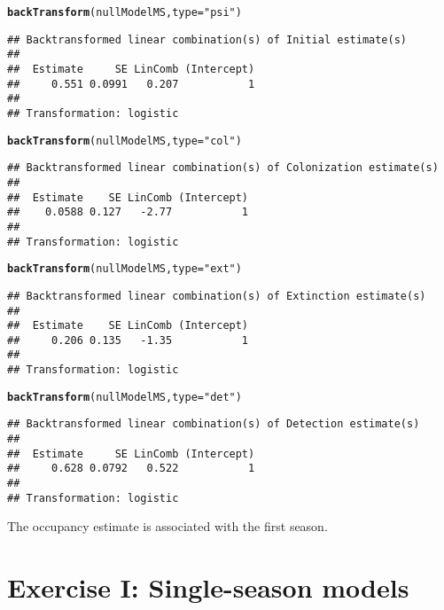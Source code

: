 \documentclass[12pt]{article}\usepackage[]{graphicx}\usepackage[]{color}
\makeatletter
\newcommand{\hlstr}[1]{\textcolor[rgb]{0.192,0.494,0.8}{#1}}%
\newcommand{\hlstd}[1]{\textcolor[rgb]{0.345,0.345,0.345}{#1}}%
\newcommand{\hlkwc}[1]{\textcolor[rgb]{0.333,0.667,0.333}{#1}}%
\newcommand{\hlkwd}[1]{\textcolor[rgb]{0.737,0.353,0.396}{\textbf{#1}}}%
\newenvironment{kframe}{%
 \def\at@end@of@kframe{}%
 \ifinner\ifhmode%
  \def\at@end@of@kframe{\end{minipage}}%
  \begin{minipage}{\columnwidth}%
 \fi\fi%
 \def\FrameCommand##1{\hskip\@totalleftmargin \hskip-\fboxsep
 \colorbox{shadecolor}{##1}\hskip-\fboxsep
     \hskip-\linewidth \hskip-\@totalleftmargin \hskip\columnwidth}%
 \MakeFramed {\advance\hsize-\width
   \@totalleftmargin\z@ \linewidth\hsize
   \@setminipage}}%
 {\par\unskip\endMakeFramed%
 \at@end@of@kframe}
\newenvironment{knitrout}{}{} %
\makeatother
\begin{document}
\begin{knitrout}
\color{fgcolor}\begin{kframe}
\begin{alltt}
\hlkwd{backTransform}\hlstd{(nullModelMS,} \hlkwc{type}\hlstd{=}\hlstr{"psi"}\hlstd{)}
\end{alltt}
\begin{verbatim}
## Backtransformed linear combination(s) of Initial estimate(s)
## 
##  Estimate     SE LinComb (Intercept)
##     0.551 0.0991   0.207           1
## 
## Transformation: logistic
\end{verbatim}
\begin{alltt}
\hlkwd{backTransform}\hlstd{(nullModelMS,} \hlkwc{type}\hlstd{=}\hlstr{"col"}\hlstd{)}
\end{alltt}
\begin{verbatim}
## Backtransformed linear combination(s) of Colonization estimate(s)
## 
##  Estimate    SE LinComb (Intercept)
##    0.0588 0.127   -2.77           1
## 
## Transformation: logistic
\end{verbatim}
\begin{alltt}
\hlkwd{backTransform}\hlstd{(nullModelMS,} \hlkwc{type}\hlstd{=}\hlstr{"ext"}\hlstd{)}
\end{alltt}
\begin{verbatim}
## Backtransformed linear combination(s) of Extinction estimate(s)
## 
##  Estimate    SE LinComb (Intercept)
##     0.206 0.135   -1.35           1
## 
## Transformation: logistic
\end{verbatim}
\begin{alltt}
\hlkwd{backTransform}\hlstd{(nullModelMS,} \hlkwc{type}\hlstd{=}\hlstr{"det"}\hlstd{)}
\end{alltt}
\begin{verbatim}
## Backtransformed linear combination(s) of Detection estimate(s)
## 
##  Estimate     SE LinComb (Intercept)
##     0.628 0.0792   0.522           1
## 
## Transformation: logistic
\end{verbatim}
\end{kframe}
\end{knitrout}

The occupancy estimate is associated with the first season. 




\clearpage

\section*{Exercise I: Single-season models}
\end{document}
